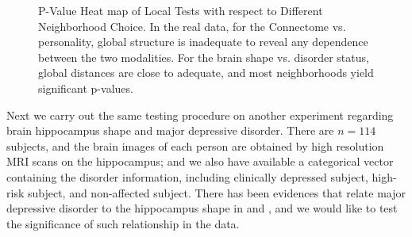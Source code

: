 \documentclass[11pt]{article}
\begin{document}
\begin{figure}[htbp]
\centering
{}
\hfil
\centering
{}
\hfil
\centering
{}
\caption{P-Value Heat map of Local Tests with respect to Different Neighborhood Choice.  In the real data, for the Connectome vs. personality, global structure is inadequate to reveal any dependence between the two modalities.  For the brain shape vs. disorder status,  global distances are close to adequate, and most neighborhoods yield significant p-values.}
\label{figReal}
\end{figure}

Next we carry out the same testing procedure on another experiment regarding brain hippocampus shape and major depressive disorder. There are $n=114$ subjects, and the brain images of each person are obtained by high resolution MRI scans on the hippocampus; and we also have available a categorical vector containing the disorder information, including clinically depressed subject, high-risk subject, and non-affected subject. There has been evidences that relate major depressive disorder to the hippocampus shape in \cite{ParkEtAl2011} and \cite{PosenerEtAl2003}, and we would like to test the significance of such relationship in the data. 
\end{document}
